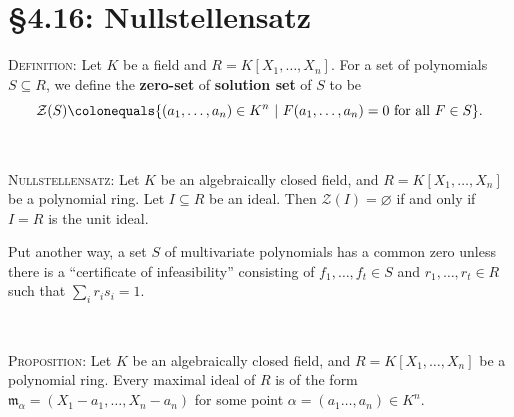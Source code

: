 \documentclass[12pt]{amsart}
\newcommand{\m}{\mathfrak{m}}
\newcommand{\1}{\mathbbm{1}}
\newcommand{\cZ}{\mathcal{Z}}
\newcommand{\showsol}[1]{\def\displaysol{#1}}
\newcommand\ceq{\colonequals}
\begin{document}
\showsol{1}
	
	\thispagestyle{empty}
	
	\section*{\S4.16: Nullstellensatz}	

\begin{framed}

\noindent \textsc{Definition:} Let $K$ be a field and $R=K[X_1,\dots,X_n]$. For a set of polynomials $S\subseteq R$, we define the \textbf{zero-set} of \textbf{solution set} of $S$ to be
\[ \cZ(S) \ceq \{ (a_1,\dots,a_n)\in K^n \ | \ F(a_1,\dots,a_n)=0 \ \text{for all} \ F\in S\}.\]

\

\noindent \textsc{Nullstellensatz:} Let $K$ be an algebraically closed field, and $R=K[X_1,\dots,X_n]$ be a polynomial ring. Let $I\subseteq R$ be an ideal. Then $\cZ(I)=\varnothing$ if and only if $I=R$ is the unit ideal. 

Put another way, a set $S$ of multivariate polynomials has a common zero unless there is a ``certificate of infeasibility'' consisting of $f_1,\dots,f_t\in S$ and $r_1,\dots,r_t\in R$ such that $\sum_i r_i s_i = 1$.

\

\noindent \textsc{Proposition:} Let $K$ be an algebraically closed field, and $R=K[X_1,\dots,X_n]$ be a polynomial ring. Every maximal ideal of $R$ is of the form $\m_\alpha = (X_1-a_1,\dots,X_n-a_n)$ for some point $\alpha=(a_1\dots,a_n)\in K^n$.

\end{framed}
\end{document}
